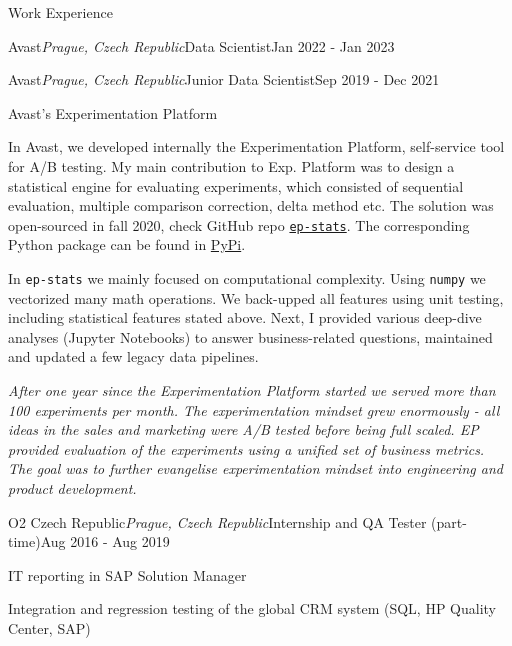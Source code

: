 \documentclass{resume} %
\begin{document}
\begin{rSection}{Work Experience}
\begin{rSubsection}{Avast}{\em Prague, Czech Republic}{Data Scientist}{Jan 2022 - Jan 2023}
    \end{rSubsection}

    \begin{rSubsection}{Avast}{\em Prague, Czech Republic}{Junior Data Scientist}{Sep 2019 - Dec 2021}
        \item Avast's Experimentation Platform
        
        In Avast, we developed internally the Experimentation Platform, self-service tool for A/B testing. My main contribution to Exp. Platform was to design a statistical engine for evaluating experiments, which consisted of sequential evaluation, multiple comparison correction, delta method etc.
        The solution was open-sourced in fall 2020, check GitHub repo \href{https://github.com/avast/ep-stats}{\texttt{ep-stats}}. The corresponding Python package can be found in \href{https://pypi.org/project/ep-stats/}{PyPi}.
        
        In \texttt{ep-stats} we mainly focused on computational complexity. Using \texttt{numpy} we vectorized many math operations. We back-upped all features using unit testing, including statistical features stated above.
        Next, I provided various deep-dive analyses (Jupyter Notebooks) to answer business-related questions, maintained and updated a few legacy data pipelines.

        \textit{After one year since the Experimentation Platform started we served more than 100 experiments per month. The experimentation mindset grew enormously - all ideas in the sales and marketing were A/B tested before being full scaled. EP provided evaluation of the experiments using a unified set of business metrics. The goal was to further evangelise experimentation mindset into engineering and product development.}
        
    \end{rSubsection}
        
    \begin{rSubsection}{O2 Czech Republic}{\em Prague, Czech Republic}{Internship and QA Tester (part-time)}{Aug 2016 - Aug 2019}
        \item IT reporting in SAP Solution Manager
        \item Integration and regression testing of the global CRM system (SQL, HP Quality Center, SAP)
    \end{rSubsection}
        
\end{rSection}
    
\end{document}
